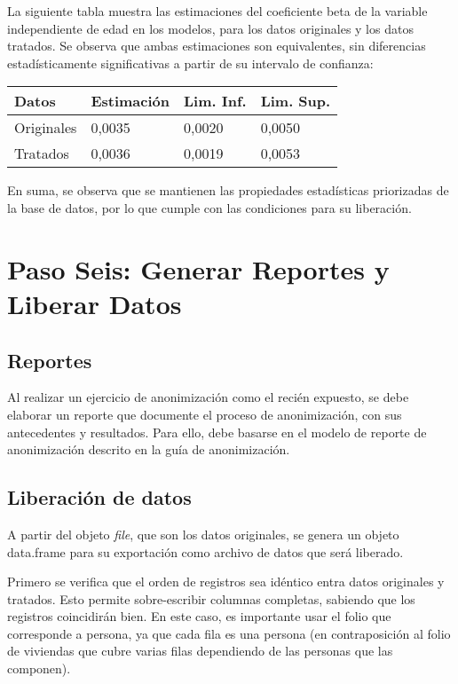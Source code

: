 \documentclass[
]{book}
\theoremstyle{definition}
\theoremstyle{definition}
\theoremstyle{definition}
\theoremstyle{definition}
\theoremstyle{remark}
\begin{document}
La siguiente tabla muestra las estimaciones del coeficiente beta de la variable independiente de edad en los modelos, para los datos originales y los datos tratados. Se observa que ambas estimaciones son equivalentes, sin diferencias estadísticamente significativas a partir de su intervalo de confianza:

\begin{longtable}[]{@{}llll@{}}
\toprule()
Datos & Estimación & Lim. Inf. & Lim. Sup. \\
\midrule()
\endhead
Originales & 0,0035 & 0,0020 & 0,0050 \\
Tratados & 0,0036 & 0,0019 & 0,0053 \\
\bottomrule()
\end{longtable}

En suma, se observa que se mantienen las propiedades estadísticas priorizadas de la base de datos, por lo que cumple con las condiciones para su liberación.

\hypertarget{paso-seis-generar-reportes-y-liberar-datos}{%
\section{Paso Seis: Generar Reportes y Liberar Datos}\label{paso-seis-generar-reportes-y-liberar-datos}}

\hypertarget{reportes}{%
\subsection{Reportes}\label{reportes}}

Al realizar un ejercicio de anonimización como el recién expuesto, se debe elaborar un reporte que documente el proceso de anonimización, con sus antecedentes y resultados. Para ello, debe basarse en el modelo de reporte de anonimización descrito en la guía de anonimización.

\hypertarget{liberaciuxf3n-de-datos}{%
\subsection{Liberación de datos}\label{liberaciuxf3n-de-datos}}

A partir del objeto \emph{file}, que son los datos originales, se genera un objeto data.frame para su exportación como archivo de datos que será liberado.

Primero se verifica que el orden de registros sea idéntico entra datos originales y tratados. Esto permite sobre-escribir columnas completas, sabiendo que los registros coincidirán bien. En este caso, es importante usar el folio que corresponde a persona, ya que cada fila es una persona (en contraposición al folio de viviendas que cubre varias filas dependiendo de las personas que las componen).
\end{document}
